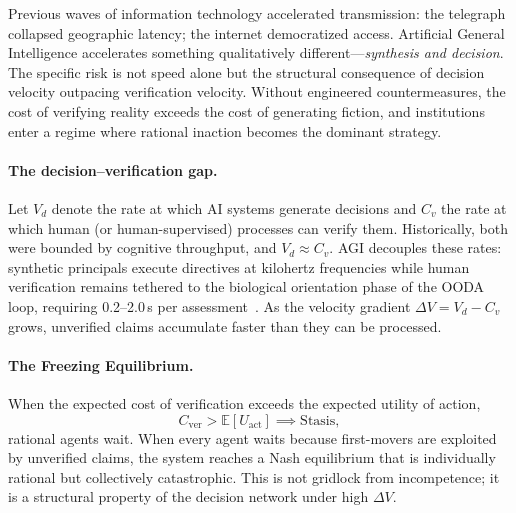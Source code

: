 \documentclass[runningheads]{llncs}
\begin{document}
Previous waves of information technology accelerated transmission: the telegraph collapsed geographic latency; the internet democratized access. Artificial General Intelligence accelerates something qualitatively different---\emph{synthesis and decision}. The specific risk is not speed alone but the structural consequence of decision velocity outpacing verification velocity. Without engineered countermeasures, the cost of verifying reality exceeds the cost of generating fiction, and institutions enter a regime where rational inaction becomes the dominant strategy.

\paragraph{The decision--verification gap.}
Let $V_d$ denote the rate at which AI systems generate decisions and $C_v$ the rate at which human (or human-supervised) processes can verify them. Historically, both were bounded by cognitive throughput, and $V_d \approx C_v$. AGI decouples these rates: synthetic principals execute directives at kilohertz frequencies while human verification remains tethered to the biological orientation phase of the OODA loop, requiring 0.2--2.0\,s per assessment~\cite{raska2025ooda,greenwood2025ooda}. As the velocity gradient $\Delta V = V_d - C_v$ grows, unverified claims accumulate faster than they can be processed.

\paragraph{The Freezing Equilibrium.}
When the expected cost of verification exceeds the expected utility of action,
\begin{equation}
C_{\mathrm{ver}} > \mathbb{E}[U_{\mathrm{act}}] \implies \text{Stasis},
\label{eq:freeze}
\end{equation}
rational agents wait. When every agent waits because first-movers are exploited by unverified claims, the system reaches a Nash equilibrium that is individually rational but collectively catastrophic. This is not gridlock from incompetence; it is a structural property of the decision network under high $\Delta V$.
\end{document}
